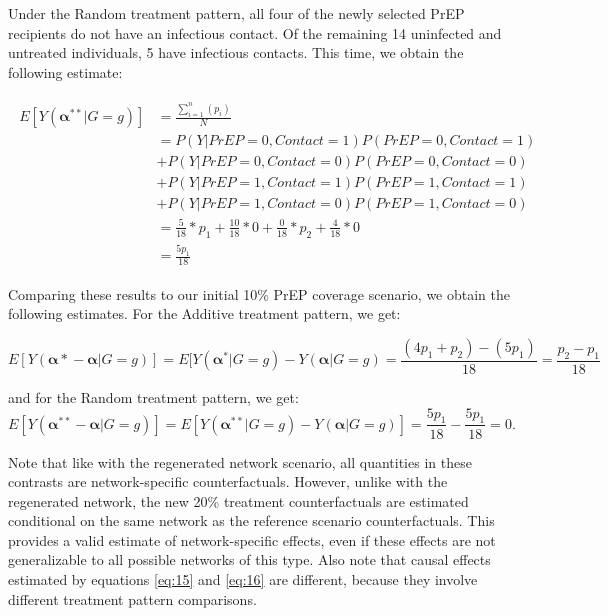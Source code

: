 \documentclass{article}
\theoremstyle{definition}
\begin{document}
Under the Random treatment pattern, all four of the newly selected PrEP recipients do not have an infectious contact. Of the remaining 14 uninfected and untreated individuals, 5 have infectious contacts. This time, we obtain the following estimate: 

\begin{align}\label{eq:14}
\begin{split}
E[Y\left(\mathbf{\alpha^{**}}|G=g\right)] & = \frac{\sum_{i=1}^{n}(p_{i})}{N}  \\ 
& = P\left(Y|PrEP = 0, Contact = 1\right)P\left(PrEP = 0, Contact = 1\right)  \\ \nonumber
& +P\left(Y|PrEP = 0, Contact = 0\right)P\left(PrEP = 0, Contact = 0\right)  \\ \nonumber
& +P\left(Y|PrEP = 1, Contact = 1\right)P\left(PrEP = 1, Contact = 1\right) \\ \nonumber
&  +P\left(Y|PrEP = 1, Contact = 0\right)P\left(PrEP = 1, Contact = 0\right) \\ \nonumber
 &= \frac{5}{18}*p_1 +  \frac{10}{18}*0+\frac{0}{18}*p_2 +  \frac{4}{18}*0  \\ \nonumber
 &=\frac{5p_1}{18}  \nonumber
 \end{split}
\end{align}

Comparing these results to our initial 10\% PrEP coverage scenario, we obtain the following estimates. For the Additive treatment pattern, we get:

\begin{equation}\label{eq:15}
E\left[Y\left(\mathbf{\alpha*}-\mathbf{\alpha}|G=g\right)\right] =  E[Y\left(\mathbf{\alpha^*}|G=g\right) -Y\left(\mathbf{\alpha}|G=g\right) = 
\frac{\left(4p_1+p_2\right)-\left(5p_1\right)}{18}=
\frac{p_2-p_1}{18}
\end{equation}

and for the Random treatment pattern, we get:
\begin{equation}\label{eq:16}
E\left[Y\left(\mathbf{\alpha^{**}}-\mathbf{\alpha}|G=g\right)\right] =E[Y\left(\mathbf{\alpha^{**}}|G=g\right) -Y\left(\mathbf{\alpha}|G=g\right)] = \frac{5p_1}{18} - \frac{5p_1}{18} =0.
\end{equation}

Note that like with the regenerated network scenario, all quantities in these contrasts are network-specific counterfactuals. However, unlike with the regenerated network, the new 20\% treatment counterfactuals are estimated conditional on the same network as the reference scenario counterfactuals. This provides a valid estimate of network-specific effects, even if these effects are not generalizable to all possible networks of this type. Also note that causal effects estimated by equations \ref{eq:15} and \ref{eq:16} are different, because they involve different treatment pattern comparisons.
\end{document}
